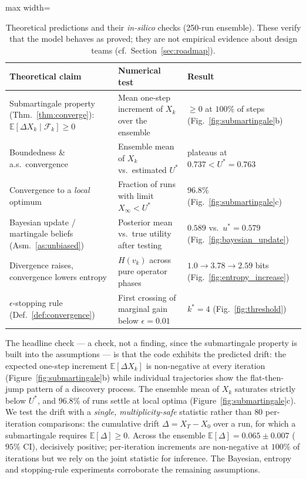 \documentclass[11pt]{article}
\newcommand{\E}{\mathbb{E}}
\newcommand{\filt}{\mathcal{F}}     %
\begin{document}
\begin{table}[h!]
\centering
\caption{Theoretical predictions and their \emph{in-silico} checks (250-run ensemble). These verify that the model behaves as proved; they are not empirical evidence about design teams (cf.\ Section~\ref{sec:roadmap}).}
\label{tab:sim}
\begin{adjustbox}{max width=\textwidth}
\begin{tabular}{@{}p{}p{}p{}@{}}
\toprule
\textbf{Theoretical claim} & \textbf{Numerical test} & \textbf{Result} \\
\midrule
Submartingale property (Thm.~\ref{thm:converge}): $\E[\Delta X_k\mid\filt_k]\ge 0$ &
Mean one-step increment of $X_k$ over the ensemble &
$\ge 0$ at $100\%$ of steps (Fig.~\ref{fig:submartingale}b) \\
Boundedness \& a.s.\ convergence &
Ensemble mean of $X_k$ vs.\ estimated $U^*$ &
plateaus at $0.737 < U^*=0.763$ \\
Convergence to a \emph{local} optimum &
Fraction of runs with limit $X_\infty < U^*$ &
$96.8\%$ (Fig.~\ref{fig:submartingale}c) \\
Bayesian update / martingale beliefs (Asm.~\ref{as:unbiased}) &
Posterior mean vs.\ true utility after testing &
$0.589$ vs.\ $u^*=0.579$ (Fig.~\ref{fig:bayesian_update}) \\
Divergence raises, convergence lowers entropy &
$H(v_k)$ across pure operator phases &
$1.0 \to 3.78 \to 2.59$ bits (Fig.~\ref{fig:entropy_increase}) \\
$\epsilon$-stopping rule (Def.~\ref{def:convergence}) &
First crossing of marginal gain below $\epsilon=0.01$ &
$k^*=4$ (Fig.~\ref{fig:threshold}) \\
\bottomrule
\end{tabular}
\end{adjustbox}
\end{table}

The headline check --- a check, not a finding, since the submartingale property is built into the assumptions --- is that the code exhibits the predicted drift: the expected one-step increment $\E[\Delta X_k]$ is non-negative at every iteration (Figure~\ref{fig:submartingale}b) while individual trajectories show the flat-then-jump pattern of a discovery process. The ensemble mean of $X_k$ saturates strictly below $U^*$, and $96.8\%$ of runs settle at local optima (Figure~\ref{fig:submartingale}c). We test the drift with a \emph{single, multiplicity-safe} statistic rather than $80$ per-iteration comparisons: the cumulative drift $\Delta=X_T-X_0$ over a run, for which a submartingale requires $\E[\Delta]\ge0$. Across the ensemble $\E[\Delta]=0.065\pm0.007$ ($95\%$ CI), decisively positive; per-iteration increments are non-negative at $100\%$ of iterations but we rely on the joint statistic for inference. The Bayesian, entropy and stopping-rule experiments corroborate the remaining assumptions.
\end{document}
